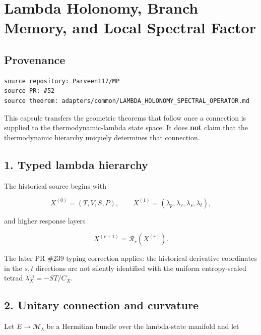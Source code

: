 \hypertarget{lambda-holonomy-branch-memory-and-local-spectral-factor}{%
\chapter{Lambda Holonomy, Branch Memory, and Local Spectral Factor}\label{lambda-holonomy-branch-memory-and-local-spectral-factor}}

\hypertarget{provenance}{%
\section{Provenance}\label{provenance}}

\begin{verbatim}
source repository: Parveen117/MP
source PR: #52
source theorem: adapters/common/LAMBDA_HOLONOMY_SPECTRAL_OPERATOR.md
\end{verbatim}

This capsule transfers the geometric theorems that follow once a connection is supplied to the thermodynamic-lambda state space. It does \textbf{not} claim that the thermodynamic hierarchy uniquely determines that connection.

\hypertarget{typed-lambda-hierarchy}{%
\section{1. Typed lambda hierarchy}\label{typed-lambda-hierarchy}}

The historical source begins with

\[
X^{(0)}=(T,V,S,P),
\qquad
X^{(1)}=(\lambda_p,\lambda_v,\lambda_s,\lambda_t),
\]

and higher response layers

\[
X^{(r+1)}=\mathcal R_r(X^{(r)}).
\]

The later PR \#239 typing correction applies: the historical derivative coordinates in the \(s,t\) directions are not silently identified with the uniform entropy-scaled tetrad \(\lambda_X^{\mathrm{th}}=-ST/C_X\).

\hypertarget{unitary-connection-and-curvature}{%
\section{2. Unitary connection and curvature}\label{unitary-connection-and-curvature}}

Let \(E\to\mathcal M_\lambda\) be a Hermitian bundle over the lambda-state manifold and let

